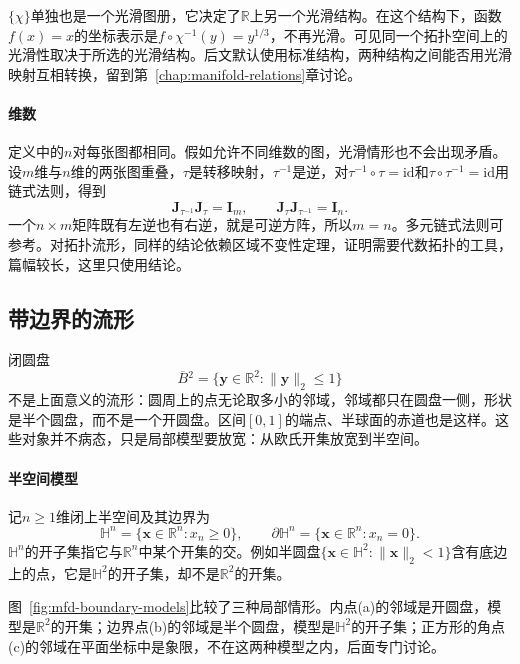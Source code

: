 $\{\chi\}$单独也是一个光滑图册，它决定了$\mathbb R$上另一个光滑结构。在这个结构下，函数$f(x)=x$的坐标表示是$f\circ\chi^{-1}(y)=y^{1/3}$，不再光滑。可见同一个拓扑空间上的光滑性取决于所选的光滑结构。后文默认使用标准结构，两种结构之间能否用光滑映射互相转换，留到第~\ref{chap:manifold-relations}章讨论。

\paragraph{维数}
定义中的$n$对每张图都相同。假如允许不同维数的图，光滑情形也不会出现矛盾。设$m$维与$n$维的两张图重叠，$\tau$是转移映射，$\tau^{-1}$是逆，对$\tau^{-1}\circ\tau=\mathrm{id}$和$\tau\circ\tau^{-1}=\mathrm{id}$用链式法则，得到
\[
\bm J_{\tau^{-1}}\bm J_{\tau}=\bm I_m,\qquad
\bm J_{\tau}\bm J_{\tau^{-1}}=\bm I_n .
\]
一个$n\times m$矩阵既有左逆也有右逆，就是可逆方阵，所以$m=n$。多元链式法则可参考。对拓扑流形，同样的结论依赖区域不变性定理，证明需要代数拓扑的工具，篇幅较长，这里只使用结论。

\subsection{带边界的流形}
\label{sec:mfd-boundary}

闭圆盘
\[
\overline{B}{}^2=\{\bm y\in\mathbb R^2:\lVert\bm y\rVert_2\leq1\}
\]
不是上面意义的流形：圆周上的点无论取多小的邻域，邻域都只在圆盘一侧，形状是半个圆盘，而不是一个开圆盘。区间$[0,1]$的端点、半球面的赤道也是这样。这些对象并不病态，只是局部模型要放宽：从欧氏开集放宽到半空间。

\paragraph{半空间模型}
记$n\geq1$维闭上半空间及其边界为
\begin{equation}
\mathbb H^n=\{\bm x\in\mathbb R^n:x_n\geq0\},\qquad
\partial\mathbb H^n=\{\bm x\in\mathbb R^n:x_n=0\}.
\label{eq:mfd-halfspace}
\end{equation}
$\mathbb H^n$的开子集指它与$\mathbb R^n$中某个开集的交。例如半圆盘$\{\bm x\in\mathbb H^2:\lVert\bm x\rVert_2<1\}$含有底边上的点，它是$\mathbb H^2$的开子集，却不是$\mathbb R^2$的开集。

图~\ref{fig:mfd-boundary-models}比较了三种局部情形。内点(a)的邻域是开圆盘，模型是$\mathbb R^2$的开集；边界点(b)的邻域是半个圆盘，模型是$\mathbb H^2$的开子集；正方形的角点(c)的邻域在平面坐标中是象限，不在这两种模型之内，后面专门讨论。

